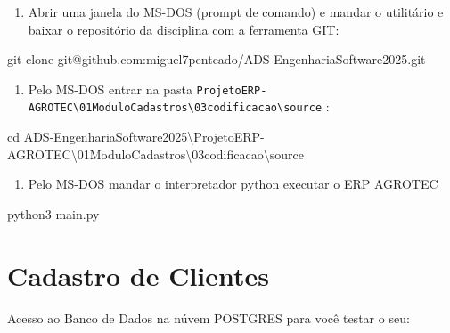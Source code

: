 \documentclass[
]{book}
\newenvironment{Shaded}{\begin{snugshade}}{\end{snugshade}}
\newcommand{\AttributeTok}[1]{\textcolor[rgb]{0.13,0.29,0.53}{#1}}
\newcommand{\BuiltInTok}[1]{#1}
\newcommand{\NormalTok}[1]{#1}
\providecommand{\tightlist}{%
  \setlength{\itemsep}{0pt}\setlength{\parskip}{0pt}}
\begin{document}
\begin{enumerate}
\def\labelenumi{\arabic{enumi}.}
\setcounter{enumi}{2}
\tightlist
\item
  Abrir uma janela do MS-DOS (prompt de comando) e mandar o utilitário e baixar o repositório da disciplina com a ferramenta GIT:
\end{enumerate}

\begin{Shaded}
\begin{Highlighting}[]
\NormalTok{git clone git@github.com:miguel7penteado}\AttributeTok{/ADS{-}EngenhariaSoftware2025}\NormalTok{.git}
\end{Highlighting}
\end{Shaded}

\begin{enumerate}
\def\labelenumi{\arabic{enumi}.}
\setcounter{enumi}{3}
\tightlist
\item
  Pelo MS-DOS entrar na pasta \texttt{ProjetoERP-AGROTEC\textbackslash{}01ModuloCadastros\textbackslash{}03codificacao\textbackslash{}source} :
\end{enumerate}

\begin{Shaded}
\begin{Highlighting}[]
\BuiltInTok{cd}\NormalTok{ ADS{-}EngenhariaSoftware2025\textbackslash{}ProjetoERP{-}AGROTEC\textbackslash{}01ModuloCadastros\textbackslash{}03codificacao\textbackslash{}source}
\end{Highlighting}
\end{Shaded}

\begin{enumerate}
\def\labelenumi{\arabic{enumi}.}
\setcounter{enumi}{4}
\tightlist
\item
  Pelo MS-DOS mandar o interpretador python executar o ERP AGROTEC
\end{enumerate}

\begin{Shaded}
\begin{Highlighting}[]
\NormalTok{python3 main.py}
\end{Highlighting}
\end{Shaded}

\section{Cadastro de Clientes}\label{cadastro-de-clientes-1}

Acesso ao Banco de Dados na núvem POSTGRES para você testar o seu:
\end{document}
